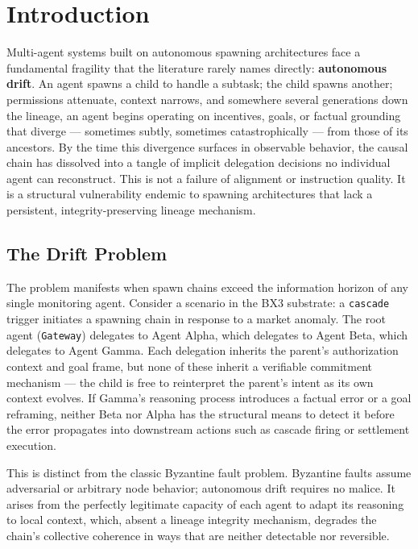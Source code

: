 \section{Introduction}

Multi-agent systems built on autonomous spawning architectures face a fundamental fragility that the literature rarely names directly: \textbf{autonomous drift}. An agent spawns a child to handle a subtask; the child spawns another; permissions attenuate, context narrows, and somewhere several generations down the lineage, an agent begins operating on incentives, goals, or factual grounding that diverge — sometimes subtly, sometimes catastrophically — from those of its ancestors. By the time this divergence surfaces in observable behavior, the causal chain has dissolved into a tangle of implicit delegation decisions no individual agent can reconstruct. This is not a failure of alignment or instruction quality. It is a structural vulnerability endemic to spawning architectures that lack a persistent, integrity-preserving lineage mechanism.

\subsection{The Drift Problem}

The problem manifests when spawn chains exceed the information horizon of any single monitoring agent. Consider a scenario in the BX3 substrate: a \texttt{cascade} trigger initiates a spawning chain in response to a market anomaly. The root agent (\texttt{Gateway}) delegates to Agent Alpha, which delegates to Agent Beta, which delegates to Agent Gamma. Each delegation inherits the parent's authorization context and goal frame, but none of these inherit a verifiable commitment mechanism — the child is free to reinterpret the parent's intent as its own context evolves. If Gamma's reasoning process introduces a factual error or a goal reframing, neither Beta nor Alpha has the structural means to detect it before the error propagates into downstream actions such as cascade firing or settlement execution.

This is distinct from the classic Byzantine fault problem. Byzantine faults assume adversarial or arbitrary node behavior; autonomous drift requires no malice. It arises from the perfectly legitimate capacity of each agent to adapt its reasoning to local context, which, absent a lineage integrity mechanism, degrades the chain's collective coherence in ways that are neither detectable nor reversible.

